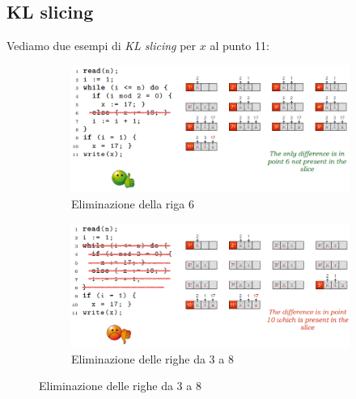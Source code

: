 \documentclass[a4paper,oneside,titlepage]{book}
\begin{document}
\subsection{KL slicing}
Vediamo due esempi di \textit{KL slicing} per $x$ al punto 11:
\begin{figure}[htp]
	\begin{subfigure}{0.49\textwidth}
	    \centering
		\includegraphics[width=\textwidth, height=\textheight, keepaspectratio]{kl1.png}
		\caption{Eliminazione della riga 6}
	\end{subfigure}
	\hfill
	\begin{subfigure}{0.49\textwidth}
	    \centering
		\includegraphics[width=\textwidth, height=\textheight, keepaspectratio]{kl2.png}
		\caption{Eliminazione delle righe da 3 a 8}
	\end{subfigure}
\end{figure}

\newpage
\end{document}
